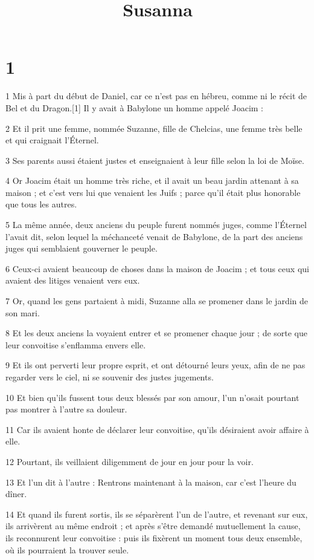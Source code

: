 

\title{Susanna}


\chapter{1}

\par 1 Mis à part du début de Daniel, car ce n'est pas en hébreu, comme ni le récit de Bel et du Dragon.[1] Il y avait à Babylone un homme appelé Joacim :
\par 2 Et il prit une femme, nommée Suzanne, fille de Chelcias, une femme très belle et qui craignait l'Éternel.
\par 3 Ses parents aussi étaient justes et enseignaient à leur fille selon la loi de Moïse.
\par 4 Or Joacim était un homme très riche, et il avait un beau jardin attenant à sa maison ; et c'est vers lui que venaient les Juifs ; parce qu'il était plus honorable que tous les autres.
\par 5 La même année, deux anciens du peuple furent nommés juges, comme l'Éternel l'avait dit, selon lequel la méchanceté venait de Babylone, de la part des anciens juges qui semblaient gouverner le peuple.
\par 6 Ceux-ci avaient beaucoup de choses dans la maison de Joacim ; et tous ceux qui avaient des litiges venaient vers eux.
\par 7 Or, quand les gens partaient à midi, Suzanne alla se promener dans le jardin de son mari.
\par 8 Et les deux anciens la voyaient entrer et se promener chaque jour ; de sorte que leur convoitise s'enflamma envers elle.
\par 9 Et ils ont perverti leur propre esprit, et ont détourné leurs yeux, afin de ne pas regarder vers le ciel, ni se souvenir des justes jugements.
\par 10 Et bien qu'ils fussent tous deux blessés par son amour, l'un n'osait pourtant pas montrer à l'autre sa douleur.
\par 11 Car ils avaient honte de déclarer leur convoitise, qu'ils désiraient avoir affaire à elle.
\par 12 Pourtant, ils veillaient diligemment de jour en jour pour la voir.
\par 13 Et l'un dit à l'autre : Rentrons maintenant à la maison, car c'est l'heure du dîner.
\par 14 Et quand ils furent sortis, ils se séparèrent l'un de l'autre, et revenant sur eux, ils arrivèrent au même endroit ; et après s'être demandé mutuellement la cause, ils reconnurent leur convoitise : puis ils fixèrent un moment tous deux ensemble, où ils pourraient la trouver seule.
